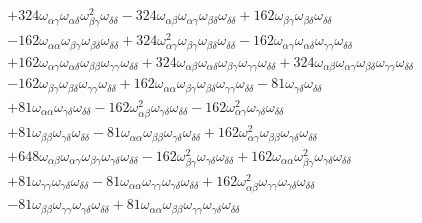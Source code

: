 \begin{equation*}
\begin{split}
    & + 324\omega_{\alpha\gamma}\omega_{\alpha\delta}\omega_{\beta\gamma}^2\omega_{\delta\delta} - 324\omega_{\alpha\beta}\omega_{\alpha\gamma}\omega_{\beta\delta}\omega_{\delta\delta} + 162\omega_{\beta\gamma}\omega_{\beta\delta}\omega_{\delta\delta} \\
    & - 162\omega_{\alpha\alpha}\omega_{\beta\gamma}\omega_{\beta\delta}\omega_{\delta\delta} + 324\omega_{\alpha\gamma}^2\omega_{\beta\gamma}\omega_{\beta\delta}\omega_{\delta\delta} - 162\omega_{\alpha\gamma}\omega_{\alpha\delta}\omega_{\gamma\gamma}\omega_{\delta\delta} \\
    & + 162\omega_{\alpha\gamma}\omega_{\alpha\delta}\omega_{\beta\beta}\omega_{\gamma\gamma}\omega_{\delta\delta} + 324\omega_{\alpha\beta}\omega_{\alpha\delta}\omega_{\beta\gamma}\omega_{\gamma\gamma}\omega_{\delta\delta} + 324\omega_{\alpha\beta}\omega_{\alpha\gamma}\omega_{\beta\delta}\omega_{\gamma\gamma}\omega_{\delta\delta} \\
    & - 162\omega_{\beta\gamma}\omega_{\beta\delta}\omega_{\gamma\gamma}\omega_{\delta\delta} + 162\omega_{\alpha\alpha}\omega_{\beta\gamma}\omega_{\beta\delta}\omega_{\gamma\gamma}\omega_{\delta\delta} - 81\omega_{\gamma\delta}\omega_{\delta\delta} \\
    & + 81\omega_{\alpha\alpha}\omega_{\gamma\delta}\omega_{\delta\delta} - 162\omega_{\alpha\beta}^2\omega_{\gamma\delta}\omega_{\delta\delta} - 162\omega_{\alpha\gamma}^2\omega_{\gamma\delta}\omega_{\delta\delta} \\
    & + 81\omega_{\beta\beta}\omega_{\gamma\delta}\omega_{\delta\delta} - 81\omega_{\alpha\alpha}\omega_{\beta\beta}\omega_{\gamma\delta}\omega_{\delta\delta} + 162\omega_{\alpha\gamma}^2\omega_{\beta\beta}\omega_{\gamma\delta}\omega_{\delta\delta} \\
    & + 648\omega_{\alpha\beta}\omega_{\alpha\gamma}\omega_{\beta\gamma}\omega_{\gamma\delta}\omega_{\delta\delta} - 162\omega_{\beta\gamma}^2\omega_{\gamma\delta}\omega_{\delta\delta} + 162\omega_{\alpha\alpha}\omega_{\beta\gamma}^2\omega_{\gamma\delta}\omega_{\delta\delta} \\
    & + 81\omega_{\gamma\gamma}\omega_{\gamma\delta}\omega_{\delta\delta} - 81\omega_{\alpha\alpha}\omega_{\gamma\gamma}\omega_{\gamma\delta}\omega_{\delta\delta} + 162\omega_{\alpha\beta}^2\omega_{\gamma\gamma}\omega_{\gamma\delta}\omega_{\delta\delta} \\
    & - 81\omega_{\beta\beta}\omega_{\gamma\gamma}\omega_{\gamma\delta}\omega_{\delta\delta} + 81\omega_{\alpha\alpha}\omega_{\beta\beta}\omega_{\gamma\gamma}\omega_{\gamma\delta}\omega_{\delta\delta}
\end{split}
\end{equation*}
